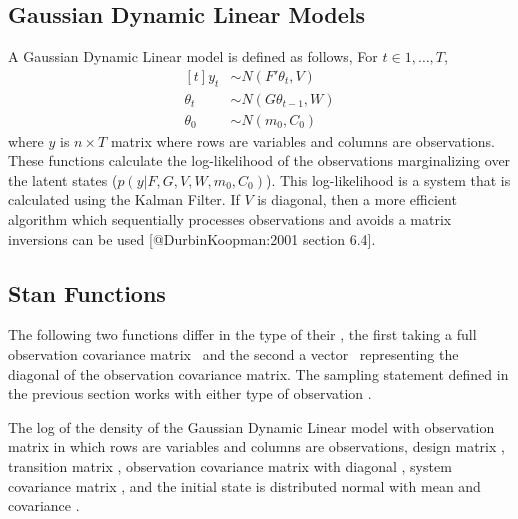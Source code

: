 \begin{description}
{\begin{description}
\section{Gaussian Dynamic Linear Models}


A Gaussian Dynamic Linear model is defined as follows, For $t \in 1, \dots, T$, \[   \begin{aligned}[t]     y_{t} &\sim N(F' \theta_{t}, V) \\     \theta_{t} &\sim N(G \theta_{t - 1}, W) \\     \theta_{0} &\sim N(m_{0}, C_{0})   \end{aligned} \] where $y$ is $n \times T$ matrix where rows are variables and columns are observations. These functions calculate the log-likelihood of the observations marginalizing over the latent states ($p(y | F, G, V, W, m_{0}, C_{0})$). This log-likelihood is a system that is calculated using the Kalman Filter. If $V$ is diagonal, then a more efficient algorithm which sequentially processes observations and avoids a matrix inversions can be used [@DurbinKoopman:2001 section 6.4].




\subsection{Stan Functions}


The following two functions differ in the type of their , the first taking a full observation covariance matrix \ and the second a vector \ representing the diagonal of the observation covariance matrix.  The sampling statement defined in the previous section works with either type of observation .


\begin{description}   {The log of the density of the Gaussian Dynamic   Linear model with observation matrix  in which rows are   variables and columns are observations, design matrix ,   transition matrix , observation covariance matrix with   diagonal , system covariance matrix , and the   initial state is distributed normal with mean  and   covariance .} \end{description}



\end{description}}
\end{description}
